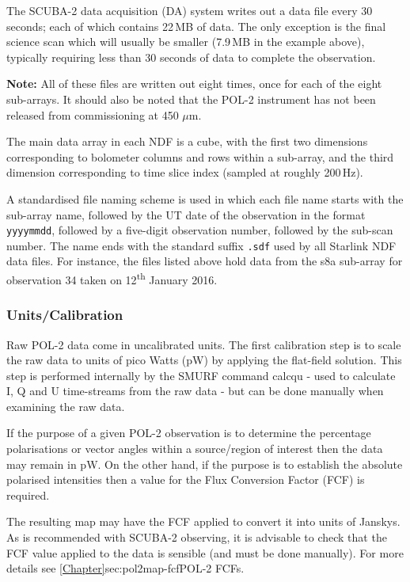 The SCUBA-2 data acquisition (DA) system writes out a data file every
30 seconds; each of which contains 22\,MB of data. The only exception
is the final science scan which will usually be smaller (7.9\,MB in
the example above), typically requiring less than 30 seconds of data
to complete the observation.

\textbf{Note:} All of these files are written out eight times, once
for each of the eight sub-arrays. It should also be noted that the
POL-2 instrument has not been released from commissioning at 450
$\mu$m.

The main data array in each NDF is a cube, with the first two
dimensions corresponding to bolometer columns and rows within a
sub-array, and the third dimension corresponding to time slice index
(sampled at roughly 200\,Hz).

A standardised file naming scheme is used in which each file name
starts with the sub-array name, followed by the UT date of the
observation in the format \texttt{yyyymmdd}, followed by a five-digit
observation number, followed by the sub-scan number. The name ends
with the standard suffix \texttt{.sdf} used by all Starlink NDF data
files. For instance, the files listed above hold data from the s8a
sub-array for observation 34 taken on 12\textsuperscript{th} January
2016.




\subsubsection*{Units/Calibration}

Raw POL-2 data come in uncalibrated units. The first calibration step
is to scale the raw data to units of pico Watts (pW) by applying the
flat-field solution. This step is performed internally by the SMURF
command calcqu - used to calculate I, Q and U time-streams from the
raw data - but can be done manually when examining the raw data.

If the purpose of a given POL-2 observation is to determine the
percentage polarisations or vector angles within a source/region of
interest then the data may remain in pW. On the other hand, if the
purpose is to establish the absolute polarised intensities then a
value for the Flux Conversion Factor (FCF) is required.

The resulting map may have the FCF applied to convert it into units of
Janskys. As is recommended with SCUBA-2 observing, it is advisable to
check that the FCF value applied to the data is sensible (and must be
done manually). For more details see
\cref{Chapter}{sec:pol2map-fcf}{POL-2 FCFs}.





